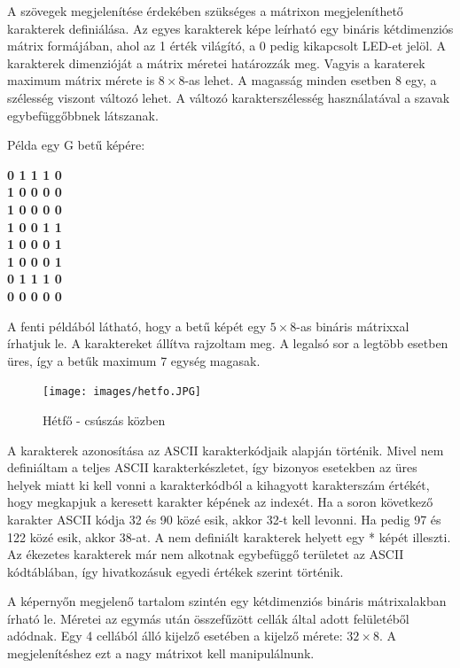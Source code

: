 \documentclass[a4paper, 12pt]{article}
\begin{document}
A szövegek megjelenítése érdekében szükséges a mátrixon megjeleníthető karakterek definiálása. Az egyes karakterek képe leírható egy bináris kétdimenziós mátrix formájában, ahol az 1 érték világító, a 0 pedig kikapcsolt LED-et jelöl.
A karakterek dimenzióját a mátrix méretei határozzák meg. Vagyis a karaterek maximum mátrix mérete is $8\times 8$-as lehet. A magasság minden esetben 8 egy, a szélesség viszont változó lehet. A változó karakterszélesség használatával a szavak egybefüggőbbnek látszanak.

Példa egy G betű képére:
\begin{center}
\textbf{0 1 1 1 0\\
1 0 0 0 0\\
1 0 0 0 0\\
1 0 0 1 1\\
1 0 0 0 1\\
1 0 0 0 1\\
0 1 1 1 0\\
0 0 0 0 0}
\end{center}
A fenti példából látható, hogy a betű képét egy $5\times 8$-as bináris mátrixxal írhatjuk le. A karaktereket állítva rajzoltam meg. A legalsó sor a legtöbb esetben üres, így a betűk maximum 7 egység magasak.

\begin{figure}[ht]
	\centering
	\texttt{[image: images/hetfo.JPG]}
	\caption{Hétfő - csúszás közben}
	\label{fig:hetfo}
\end{figure}	


A karakterek azonosítása az ASCII karakterkódjaik alapján történik. Mivel nem definiáltam a teljes ASCII karakterkészletet, így bizonyos esetekben az üres helyek miatt ki kell vonni a karakterkódból a kihagyott karakterszám értékét, hogy megkapjuk a keresett karakter képének az indexét.
Ha a soron következő karakter ASCII kódja 32 és 90 közé esik, akkor 32-t kell levonni. Ha pedig 97 és 122 közé esik, akkor 38-at. A nem definiált karakterek helyett egy * képét illeszti.
Az ékezetes karakterek már nem alkotnak egybefüggő területet az ASCII kódtáblában, így hivatkozásuk egyedi értékek szerint történik.

A képernyőn megjelenő tartalom szintén egy kétdimenziós bináris mátrixalakban írható le. Méretei az egymás után összefűzött cellák által adott felületéből adódnak. Egy 4 cellából álló kijelző esetében a kijelző mérete: $32\times 8$.
A megjelenítéshez ezt a nagy mátrixot kell manipulálnunk.
\end{document}
